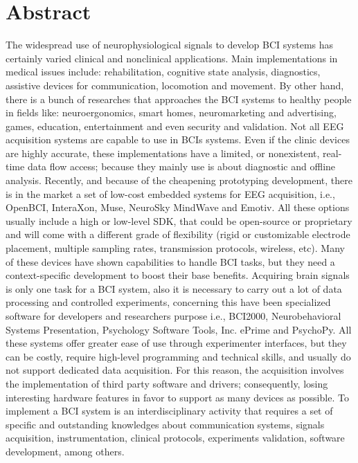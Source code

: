 \cleardoublepage
\chapter*{Abstract}

The widespread use of neurophysiological signals to develop \gls*{BCI} systems has certainly varied clinical and nonclinical applications. Main implementations in medical issues include: rehabilitation, cognitive state analysis, diagnostics, assistive devices for communication, locomotion and movement. By other hand, there is a bunch of researches that approaches the \gls*{BCI} systems to healthy people in fields like: neuroergonomics, smart homes, neuromarketing and advertising, games, education, entertainment and even security and validation. Not all EEG acquisition systems are capable to use in \gls*{BCI}s systems. Even if the clinic devices are highly accurate, these implementations have a limited, or nonexistent, real-time data flow access; because they mainly use is about diagnostic and offline analysis. Recently, and because of the cheapening prototyping development, there is in the market a set of low-cost embedded systems for \gls*{EEG} acquisition, i.e., OpenBCI, InteraXon, Muse, NeuroSky MindWave and Emotiv. All these options usually include a high or low-level \gls*{SDK}, that could be open-source or proprietary and will come with a different grade of flexibility (rigid or customizable electrode placement, multiple sampling rates, transmission protocols, wireless, etc). Many of these devices have shown capabilities to handle \gls*{BCI} tasks, but they need a context-specific development to boost their base benefits. Acquiring brain signals is only one task for a \gls*{BCI} system, also it is necessary to carry out a lot of data processing and controlled experiments, concerning this have been specialized software for developers and researchers purpose i.e., BCI2000, Neurobehavioral Systems Presentation, Psychology Software Tools, Inc. ePrime and PsychoPy. All these systems offer greater ease of use through experimenter interfaces, but they can be costly, require high-level programming and technical skills, and usually do not support dedicated data acquisition. For this reason, the acquisition involves the implementation of third party software and drivers; consequently, losing interesting hardware features in favor to support as many devices as possible. To implement a \gls*{BCI} system is an interdisciplinary activity that requires a set of specific and outstanding knowledges about communication systems, signals acquisition, instrumentation, clinical protocols, experiments validation, software development, among others.\\

